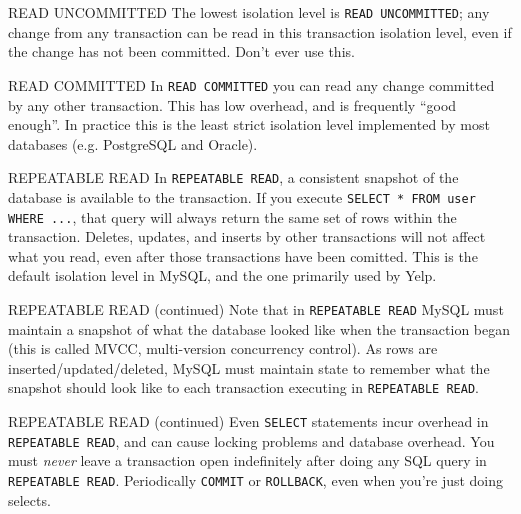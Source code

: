 \documentclass[14pt]{beamer}
\begin{document}
\begin{frame}{READ UNCOMMITTED}
  The lowest isolation level is \texttt{READ UNCOMMITTED}; any change from any
  transaction can be read in this transaction isolation level, even if the
  change has not been committed.
  \newline
  \newline
  Don't ever use this.
\end{frame}

\begin{frame}{READ COMMITTED}
  In \texttt{READ COMMITTED} you can read any change committed by any other
  transaction. This has low overhead, and is frequently ``good enough''.
  \newline
  \newline
  In practice this is the least strict isolation level implemented by most
  databases (e.g. PostgreSQL and Oracle).
\end{frame}

\begin{frame}{REPEATABLE READ}
  In \texttt{REPEATABLE READ}, a consistent snapshot of the database is
  available to the transaction. If you execute \texttt{SELECT * FROM user WHERE
    ...}, that query will always return the same set of rows within the
  transaction. Deletes, updates, and inserts by other transactions will not
  affect what you read, even after those transactions have been comitted.
  \newline
  \newline
  This is the default isolation level in MySQL, and the one primarily used by Yelp.
\end{frame}

\begin{frame}{REPEATABLE READ (continued)}
  Note that in \texttt{REPEATABLE READ} MySQL must maintain a snapshot of what
  the database looked like when the transaction began (this is called
  MVCC, multi-version concurrency control).
  \newline
  \newline
  As rows are inserted/updated/deleted, MySQL must maintain state to remember
  what the snapshot should look like to each transaction executing in
  \texttt{REPEATABLE READ}.
\end{frame}

\begin{frame}{REPEATABLE READ (continued)}
  Even \texttt{SELECT} statements incur overhead in \texttt{REPEATABLE READ},
  and can cause locking problems and database overhead.
  \newline
  \newline
  You must \emph{never} leave a transaction open indefinitely after doing any
  SQL query in \texttt{REPEATABLE READ}. Periodically \texttt{COMMIT} or
  \texttt{ROLLBACK}, even when you're just doing selects.
\end{frame}
\end{document}

